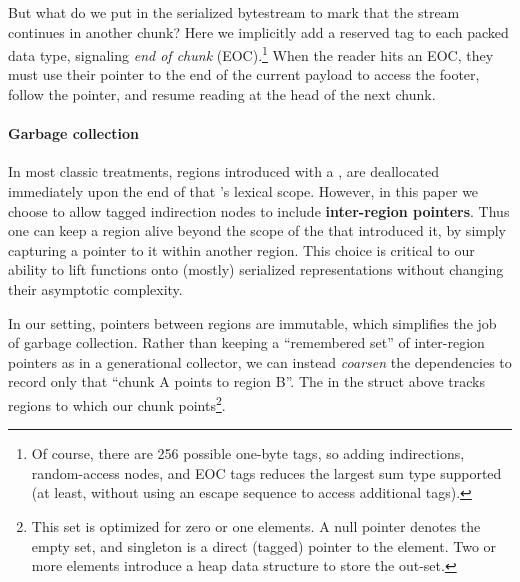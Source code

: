 But what do we put in the serialized bytestream to mark that the stream
continues in another chunk?  Here we implicitly add a reserved tag to each
packed data type, signaling {\em end of chunk} (EOC).\footnote{Of course, there
  are 256 possible one-byte tags, so adding indirections, random-access nodes,
  and EOC tags reduces the largest sum type supported (at least, without using
  an escape sequence to access additional tags).}
%
When the reader hits an EOC, they must use their pointer to the end of the
current payload to access the footer, follow the  pointer, and resume
reading at the head of the next chunk.



\paragraph{Garbage collection}

In most classic treatments, regions introduced with a ,
are deallocated immediately upon the end of that 's lexical
scope.
%
However, in this paper we choose to allow tagged indirection nodes to include
{\bf inter-region pointers}.  Thus one can keep a region alive beyond the scope of the
 that introduced it, by simply capturing a pointer to it within
another region.
%
This choice is critical to our ability to lift functions onto (mostly)
serialized representations without changing their asymptotic complexity.

In our setting, pointers between regions are immutable, which simplifies the job of
garbage collection.  Rather than keeping a ``remembered set'' of inter-region pointers as
in a generational collector, we can instead \emph{coarsen} the dependencies to record only
that ``chunk A points to region B''.  The  in the  struct above
tracks regions to which our chunk points\footnote{This set is optimized for zero or one
  elements.  A null pointer denotes the empty set, and singleton is a direct (tagged)
  pointer to the element.  Two or more elements introduce a heap data structure to store
  the out-set.}.

